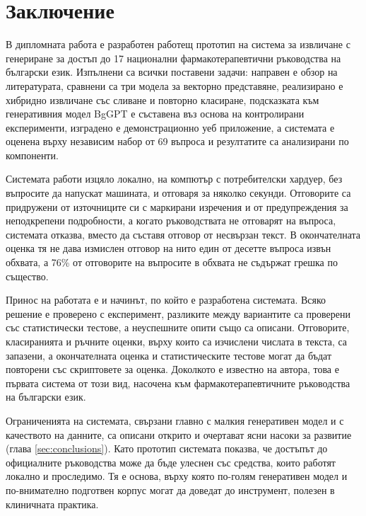 \documentclass[12pt,a4paper]{article}
\let\origsection\section
\renewcommand{\section}{\clearpage\origsection}
\begin{document}
\section{Заключение}
В дипломната работа е разработен работещ прототип на система за извличане с генериране за достъп до 17 национални фармакотерапевтични ръководства на български език. Изпълнени са всички поставени задачи: направен е обзор на литературата, сравнени са три модела за векторно представяне, реализирано е хибридно извличане със сливане и повторно класиране, подсказката към генеративния модел BgGPT е съставена въз основа на контролирани експерименти, изградено е демонстрационно уеб приложение, а системата е оценена върху независим набор от 69 въпроса и резултатите са анализирани по компоненти.

Системата работи изцяло локално, на компютър с потребителски хардуер, без въпросите да напускат машината, и отговаря за няколко секунди. Отговорите са придружени от източниците си с маркирани изречения и от предупреждения за неподкрепени подробности, а когато ръководствата не отговарят на въпроса, системата отказва, вместо да съставя отговор от несвързан текст. В окончателната оценка тя не дава измислен отговор на нито един от десетте въпроса извън обхвата, а 76\% от отговорите на въпросите в обхвата не съдържат грешка по същество.

Принос на работата е и начинът, по който е разработена системата. Всяко решение е проверено с експеримент, разликите между вариантите са проверени със статистически тестове, а неуспешните опити също са описани. Отговорите, класиранията и ръчните оценки, върху които са изчислени числата в текста, са запазени, а окончателната оценка и статистическите тестове могат да бъдат повторени със скриптовете за оценка. Доколкото е известно на автора, това е първата система от този вид, насочена към фармакотерапевтичните ръководства на български език.

Ограниченията на системата, свързани главно с малкия генеративен модел и с качеството на данните, са описани открито и очертават ясни насоки за развитие (глава \ref{sec:conclusions}). Като прототип системата показва, че достъпът до официалните ръководства може да бъде улеснен със средства, които работят локално и проследимо. Тя е основа, върху която по-голям генеративен модел и по-внимателно подготвен корпус могат да доведат до инструмент, полезен в клиничната практика.
\end{document}

